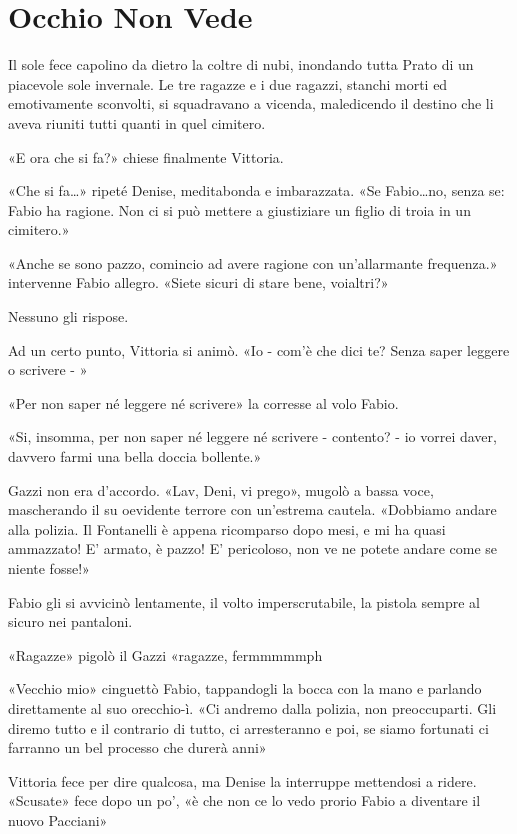 \chapter{Occhio Non Vede}

Il sole fece capolino da dietro la coltre di nubi, inondando tutta Prato di un piacevole sole invernale. Le tre ragazze e i due ragazzi, stanchi morti ed emotivamente sconvolti, si squadravano a vicenda, maledicendo il destino che li aveva riuniti tutti quanti in quel cimitero.

«E ora che si fa?» chiese finalmente Vittoria.

«Che si fa\ldots» ripeté Denise, meditabonda e imbarazzata. «Se Fabio\ldots no, senza se: Fabio ha ragione. Non ci si può mettere a giustiziare un figlio di troia in un cimitero.»

«Anche se sono pazzo, comincio ad avere ragione con un'allarmante frequenza.» intervenne Fabio allegro. «Siete sicuri di stare bene, voialtri?»

Nessuno gli rispose.

Ad un certo punto, Vittoria si animò. «Io - com'è che dici te? Senza saper leggere o scrivere - »

«Per non saper né leggere né scrivere» la corresse al volo Fabio.

«Si, insomma, per non saper né leggere né scrivere - contento? - io vorrei daver, davvero farmi una bella doccia bollente.»

Gazzi non era d'accordo. «Lav, Deni, vi prego», mugolò a bassa voce, mascherando il su oevidente terrore con un'estrema cautela. «Dobbiamo andare alla polizia. Il Fontanelli è appena ricomparso dopo mesi, e mi ha quasi ammazzato! E' armato, è pazzo! E' pericoloso, non ve ne potete andare come se niente fosse!»

Fabio gli si avvicinò lentamente, il volto imperscrutabile, la pistola sempre al sicuro nei pantaloni. 

«Ragazze» pigolò il Gazzi «ragazze, fermmmmmph

«Vecchio mio» cinguettò Fabio, tappandogli la bocca con la mano e parlando direttamente al suo orecchio-ì. «Ci andremo dalla polizia, non preoccuparti. Gli diremo tutto e il contrario di tutto, ci arresteranno e poi, se siamo fortunati ci farranno un bel processo che durerà anni»

Vittoria fece per dire qualcosa, ma Denise la interruppe mettendosi a ridere. «Scusate» fece dopo un po', «è che non ce lo vedo prorio Fabio a diventare il nuovo Pacciani»

